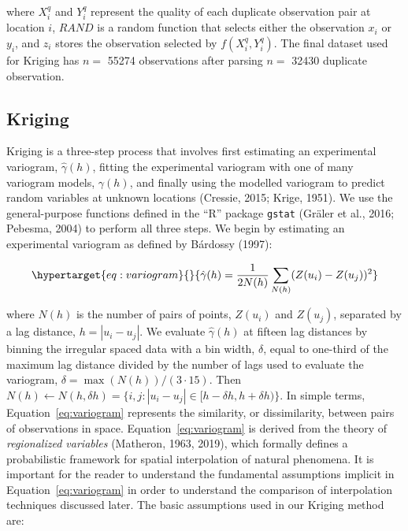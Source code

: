\documentclass[draft,linenumbers]{agujournal2018}
\begin{document}
where \(X_i^q\) and \(Y_i^q\) represent the quality of each duplicate
observation pair at location \(i\), \(RAND\) is a random function that
selects either the observation \(x_i\) or \(y_i\), and \(z_i\) stores
the observation selected by \(f(X_i^q, Y_i^q)\). The final dataset used
for Kriging has \(n=\) 55274 observations after parsing \(n=\) 32430
duplicate observation.

\subsection{Kriging}

Kriging is a three-step process that involves first estimating an
experimental variogram, \(\hat{\gamma}(h)\), fitting the experimental
variogram with one of many variogram models, \(\gamma(h)\), and finally
using the modelled variogram to predict random variables at unknown
locations (Cressie, 2015; Krige, 1951). We use the general-purpose
functions defined in the ``R'' package \texttt{gstat} (Gräler et al.,
2016; Pebesma, 2004) to perform all three steps. We begin by estimating
an experimental variogram as defined by Bárdossy (1997):

\begin{equation}\protect\hypertarget{eq:variogram}{}{\hat{\gamma}(h) = \frac{1}{2N(h)}\sum_{N(h)}^{}(Z(u_i) - Z(u_j))^2}\label{eq:variogram}\end{equation}

where \(N(h)\) is the number of pairs of points, \(Z(u_i)\) and
\(Z(u_j)\), separated by a lag distance, \(h = |u_i - u_j|\). We
evaluate \(\hat{\gamma}(h)\) at fifteen lag distances by binning the
irregular spaced data with a bin width, \(\delta\), equal to one-third
of the maximum lag distance divided by the number of lags used to
evaluate the variogram, \(\delta = \max (N(h))/(3\cdot 15)\). Then
\(N(h) \leftarrow N(h, \delta h) = \{i,j:|u_i - u_j| \in [h - \delta h, h + \delta h)\}\).
In simple terms, Equation~\ref{eq:variogram} represents the similarity,
or dissimilarity, between pairs of observations in space.
Equation~\ref{eq:variogram} is derived from the theory of
\emph{regionalized variables} (Matheron, 1963, 2019), which formally
defines a probabilistic framework for spatial interpolation of natural
phenomena. It is important for the reader to understand the fundamental
assumptions implicit in Equation~\ref{eq:variogram} in order to
understand the comparison of interpolation techniques discussed later.
The basic assumptions used in our Kriging method are:
\end{document}
